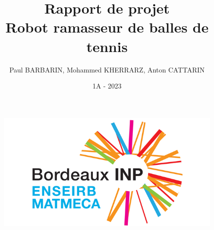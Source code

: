 \documentclass[12pt]{article}
\title{Rapport de projet \\ \textbf{Robot ramasseur de balles de tennis}}
\author{Paul BARBARIN, Mohammed KHERRARZ, Anton CATTARIN}
\date{1A - 2023}
\begin{document}
    \begin{titlepage}

        \begin{figure}
            \centering
            \includegraphics{img/enseirb}
        \end{figure}
        \maketitle

    \end{titlepage}
\end{document}
